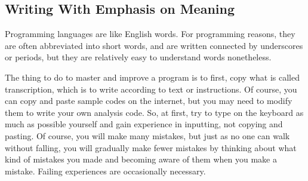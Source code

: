 \documentclass{ltjsbook}
\begin{document}
\subsection{Writing With Emphasis on Meaning}
Programming languages are like English words. For programming reasons, they are often abbreviated into short words, and are written connected by underscores or periods, but they are relatively easy to understand words nonetheless.

The thing to do to master and improve a program is to first, copy what is called transcription, which is to write according to text or instructions. Of course, you can copy and paste sample codes on the internet, but you may need to modify them to write your own analysis code. So, at first, try to type on the keyboard as much as possible yourself and gain experience in inputting, not copying and pasting. Of course, you will make many mistakes, but just as no one can walk without falling, you will gradually make fewer mistakes by thinking about what kind of mistakes you made and becoming aware of them when you make a mistake. Failing experiences are occasionally necessary.
\end{document}
